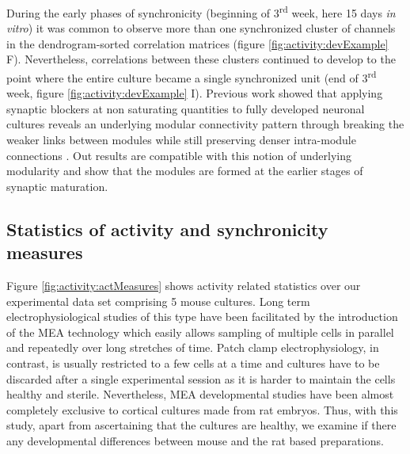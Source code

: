     During the early phases of synchronicity (beginning of 3\textsuperscript{rd} week, here 15 days \textit{in vitro}) it was common to observe more than one synchronized cluster of channels in the dendrogram-sorted correlation matrices (figure \ref{fig:activity:devExample} F). Nevertheless, correlations between these clusters continued to develop to the point where the entire culture became a single synchronized unit (end of 3\textsuperscript{rd} week, figure \ref{fig:activity:devExample} I). Previous work showed that applying synaptic blockers at non saturating quantities to fully developed neuronal cultures reveals an underlying modular connectivity pattern through breaking the weaker links between modules while still preserving denser intra-module connections \cite{breskin2006percolation}. Out results are compatible with this notion of underlying modularity and show that the modules are formed at the earlier stages of synaptic maturation.


        \subsection{Statistics of activity and synchronicity measures}
        \label{sec:activity:activityStats}

        Figure \ref{fig:activity:actMeasures} shows activity related statistics over our experimental data set comprising 5 mouse cultures. Long term electrophysiological studies of this type have been facilitated by the introduction of the MEA technology which easily allows sampling of multiple cells in parallel and repeatedly over long stretches of time. Patch clamp electrophysiology, in contrast, is usually restricted to a few cells at a time and cultures have to be discarded after a single experimental session as it is harder to maintain the cells healthy and sterile. Nevertheless, MEA developmental studies have been almost completely exclusive to cortical cultures made from rat embryos. Thus, with this study, apart from ascertaining that the cultures are healthy, we examine if there any developmental differences between mouse and the rat based preparations.

